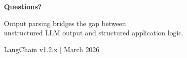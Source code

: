 \documentclass[aspectratio=169,11pt]{beamer}
\begin{document}
\begin{frame}[noframenumbering]
\begin{center}
\vspace{1.5cm}
\huge\textbf{Questions?}

\vspace{1.5cm}

\large Output parsing bridges the gap between\\
unstructured LLM output and structured application logic.

\vspace{1.5cm}

\small\textcolor{docgray}{LangChain v1.2.x | March 2026}
\end{center}
\end{frame}
\end{document}
